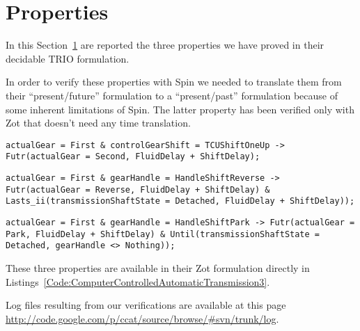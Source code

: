 \section{Properties}
\label{Section:Properties}
In this Section~\ref{Section:Properties} are reported the three properties we have proved in their decidable TRIO formulation. 

In order to verify these properties with Spin we needed to translate them from their ``present/future'' formulation to a ``present/past'' formulation because of some inherent limitations of Spin. The latter property has been verified only with Zot that doesn't need any time translation.

\begin{lstlisting}[language=TRIO,basicstyle=\small,breaklines,breakatwhitespace,frame=single,caption=Property 1,label=Code:Property1]
actualGear = First & controlGearShift = TCUShiftOneUp -> Futr(actualGear = Second, FluidDelay + ShiftDelay);
\end{lstlisting}

\begin{lstlisting}[language=TRIO,basicstyle=\small,breaklines,breakatwhitespace,frame=single,caption=Property 2,label=Code:Property2]
actualGear = First & gearHandle = HandleShiftReverse -> Futr(actualGear = Reverse, FluidDelay + ShiftDelay) & Lasts_ii(transmissionShaftState = Detached, FluidDelay + ShiftDelay));
\end{lstlisting}

\begin{lstlisting}[language=TRIO,basicstyle=\small,breaklines,breakatwhitespace,frame=single,caption=Property 3,label=Code:Property3]
actualGear = First & gearHandle = HandleShiftPark -> Futr(actualGear = Park, FluidDelay + ShiftDelay) & Until(transmissionShaftState = Detached, gearHandle <> Nothing));
\end{lstlisting}

These three properties are available in their Zot formulation directly in Listings~\ref{Code:ComputerControlledAutomaticTransmission3}.

Log files resulting from our verifications are available at this page \url{http://code.google.com/p/ccat/source/browse/#svn/trunk/log}.